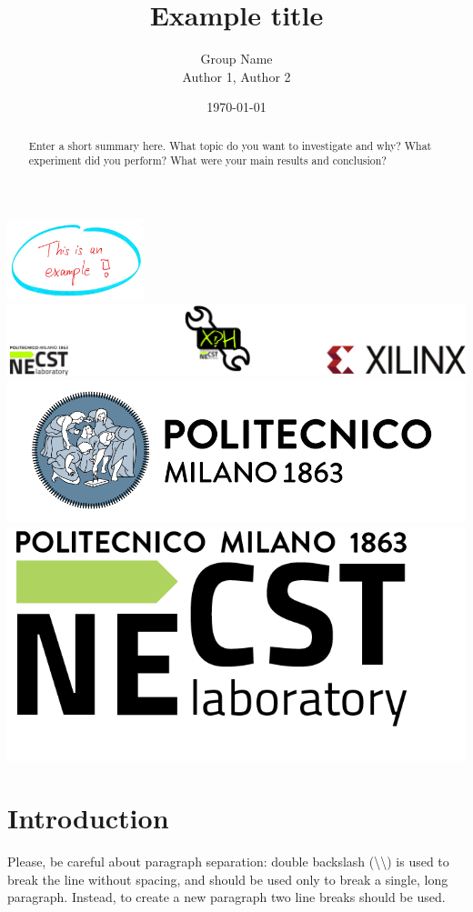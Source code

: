 \documentclass[12pt,oneside,a4paper]{article}
\title{\textbf{Example title}}
\author{Group Name\\Author 1, Author 2}
\date{\today}
\begin{document}
\begin{titlepage}
	\centering
	\clearpage
	\maketitle
	\thispagestyle{empty}
	\vspace*{1cm}
	\includegraphics[width=4cm]{example.jpg} %
	\vfill
	\centering
	\includegraphics{footer.png}
	\includegraphics{logo_polimi.png}\includegraphics{logo_NECST.png}
\end{titlepage}


\begin{abstract}
Enter a short summary here. What topic do you want to investigate and why? What experiment did you perform? What were your main results and conclusion?
\end{abstract}

\section{Introduction} \label{sec:intro}
Please, be careful about paragraph separation: double backslash (\textbackslash\textbackslash) is used to break the line without spacing, and should be used only to break a single, long paragraph. Instead, to create a new paragraph two line breaks should be used.
\end{document}
